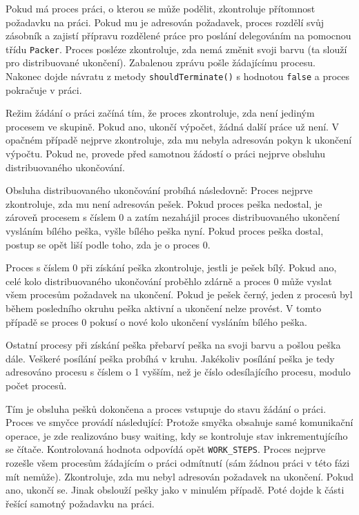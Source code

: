\documentclass[12pt]{article}
\begin{document}
Pokud má proces práci, o kterou se může podělit, zkontroluje přítomnost požadavku na práci. Pokud mu je adresován požadavek, proces rozdělí svůj zásobník a zajistí přípravu rozdělené práce pro poslání delegováním na pomocnou třídu \texttt{Packer}. Proces posléze zkontroluje, zda nemá změnit svoji barvu (ta slouží pro distribuované ukončení). Zabalenou zprávu pošle žádajícímu procesu. Nakonec dojde návratu z metody \texttt{shouldTerminate()} s hodnotou \texttt{false} a proces pokračuje v práci.

Režim žádání o práci začíná tím, že proces zkontroluje, zda není jediným procesem ve skupině. Pokud ano, ukončí výpočet, žádná další práce už není. V opačném případě nejprve zkontroluje, zda mu nebyla adresován pokyn k ukončení výpočtu. Pokud ne, provede před samotnou žádostí o práci nejprve obsluhu distribuovaného ukončování.

Obsluha distribuovaného ukončování probíhá následovně: Proces nejprve zkontroluje, zda mu není adresován pešek. Pokud proces peška nedostal, je zároveň procesem s číslem 0 a zatím nezahájil proces distribuovaného ukončení vysláním bílého peška, vyšle bílého peška nyní. Pokud proces peška dostal, postup se opět liší podle toho, zda je o proces 0.

Proces s číslem 0 při získání peška zkontroluje, jestli je pešek bílý. Pokud ano, celé kolo distribuovaného ukončování proběhlo zdárně a proces 0 může vyslat všem procesům požadavek na ukončení. Pokud je pešek černý, jeden z procesů byl během posledního okruhu peška aktivní a ukončení nelze provést. V tomto případě se proces 0 pokusí o nové kolo ukončení vysláním bílého peška.

Ostatní procesy při získání peška přebarví peška na svoji barvu a pošlou peška dále. Veškeré posílání peška probíhá v kruhu. Jakékoliv posílání peška je tedy adresováno procesu s číslem o 1 vyšším, než je číslo odesílajícího procesu, modulo počet procesů.

Tím je obsluha pešků dokončena a proces vstupuje do stavu žádání o práci. Proces ve smyčce provádí následující: Protože smyčka obsahuje samé komunikační operace, je zde realizováno busy waiting, kdy se kontroluje stav inkrementujícího se čítače. Kontrolovaná hodnota odpovídá opět \texttt{WORK\_STEPS}. Proces nejprve rozešle všem procesům žádajícím o práci odmítnutí (sám žádnou práci v této fázi mít nemůže). Zkontroluje, zda mu nebyl adresován požadavek na ukončení. Pokud ano, ukončí se. Jinak obslouží pešky jako v minulém případě. Poté dojde k části řešící samotný požadavku na práci.
\end{document}
